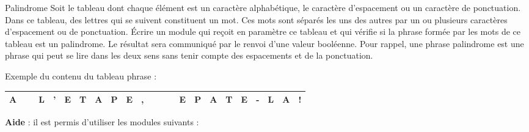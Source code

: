 \begin{Exercice}{Palindrome}
	Soit le tableau  dont chaque élément
	est un caractère alphabétique, le caractère d’espacement ou un
	caractère de ponctuation. Dans ce tableau, des lettres qui se suivent
	constituent un mot. Ces mots sont séparés les uns des autres par un ou
	plusieurs caractères d’espacement ou de ponctuation. Écrire un module
	qui reçoit en paramètre ce tableau et qui vérifie si la phrase formée
	par les mots de ce tableau est un palindrome. Le résultat sera
	communiqué par le renvoi d’une valeur booléenne. Pour rappel, une
	phrase palindrome est une phrase qui peut se lire dans les deux sens
	sans tenir compte des espacements et de la ponctuation.
	
	Exemple du contenu du tableau phrase :

	\begin{center}
	\tablehead{}
	\begin{supertabular}{|m{0.35cm}|m{0.35cm}|m{0.35cm}|m{0.35cm}|m{0.35cm}|m{0.35cm}|m{0.35cm}|m{0.35cm}|m{0.35cm}|m{0.35cm}|m{0.35cm}|m{0.35cm}|m{0.35cm}|m{0.35cm}|m{0.35cm}|m{0.35cm}|m{0.35cm}|m{0.35cm}|m{0.35cm}|m{0.35cm}|m{0.35cm}|}
	\hline
	\centering  A &
	~&
	\centering  L &
	\centering  ' &
	\centering  E &
	\centering  T &
	\centering  A &
	\centering  P &
	\centering  E &
	\centering  , &
	~&
	~&
	\centering  E &
	\centering  P &
	\centering  A &
	\centering  T &
	\centering  E &
	\centering  - &
	\centering  L &
	\centering  A &
	\centering\arraybslash  !\\\hline
	\end{supertabular}
	\end{center}

	\textbf{Aide} : il est permis d’utiliser les modules suivants :

\end{Exercice}

